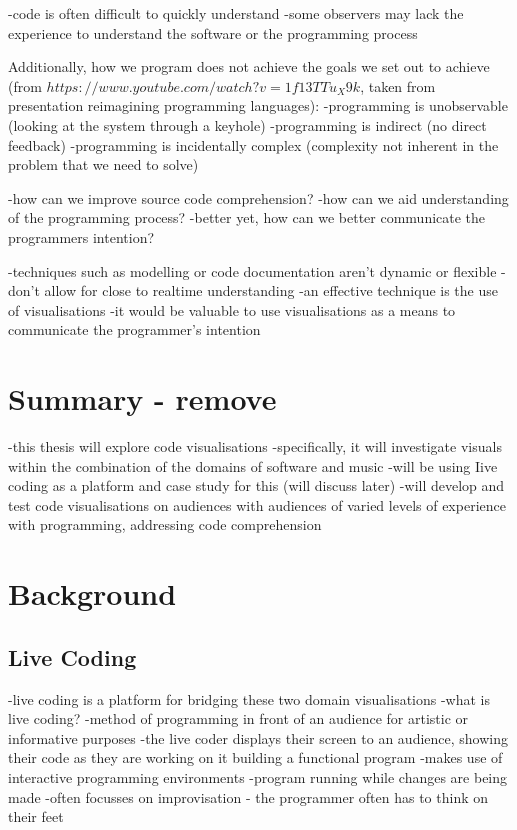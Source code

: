 -code is often difficult to quickly understand
-some observers may lack the experience to understand the software or the programming process

Additionally, how we program does not achieve the goals we set out to achieve (from $https://www.youtube.com/watch?v=1f13TTu_X9k$, taken from presentation reimagining programming languages):
-programming is unobservable (looking at the system through a keyhole)
-programming is indirect (no direct feedback)
-programming is incidentally complex (complexity not inherent in the problem that we need to solve)




-how can we improve source code comprehension?
-how can we aid understanding of the programming process?
-better yet, how can we better communicate the programmers intention?

-techniques such as modelling or code documentation aren’t dynamic or flexible
-don’t allow for close to realtime understanding
-an effective technique is the use of visualisations
-it would be valuable to use visualisations as a means to communicate the programmer’s intention

\section{Summary - remove}

-this thesis will explore code visualisations
-specifically, it will investigate visuals within the combination of the domains of software and music
-will be using Iive coding as a platform and case study for this (will discuss later)
-will develop and test code visualisations on audiences with audiences of varied levels of experience with programming, addressing code comprehension

\section{Background}
\label{sec:basis}


\subsection{Live Coding}

-live coding is a platform for bridging these two domain visualisations 
-what is live coding?
-method of programming in front of an audience for artistic or informative purposes
-the live coder displays their screen to an audience, showing their code as they are working on it building a functional program
-makes use of interactive programming environments 
-program running while changes are being made 
-often focusses on improvisation - the programmer often has to think on their feet

